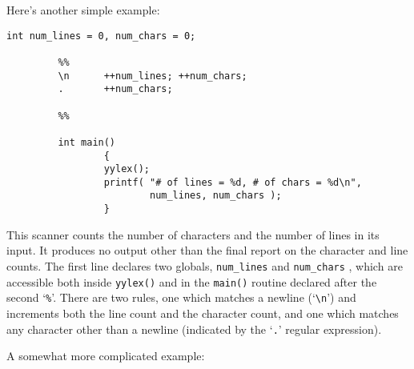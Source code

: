 \documentclass[openany,oneside]{book}
\begin{document}
Here's another simple example:


\begin{verbatim}
int num_lines = 0, num_chars = 0;
     
         %%
         \n      ++num_lines; ++num_chars;
         .       ++num_chars;
     
         %%
     
         int main()
                 {
                 yylex();
                 printf( "# of lines = %d, # of chars = %d\n",
                         num_lines, num_chars );
                 }
\end{verbatim}


This scanner counts the number of characters and the number of lines in
its input. It produces no output other than the final report on the
character and line counts.  The first line declares two globals, \verb`num_lines` and \verb`num_chars` , which are accessible both inside \verb`yylex()` and in the \verb`main()` routine declared after the
second ‘\verb`%`’.  There are two rules, one which matches a newline
(‘\verb`\n`’) and increments both the line count and the character count,
and one which matches any character other than a newline (indicated by
the ‘\verb`.`’ regular expression).

A somewhat more complicated example:
\end{document}
